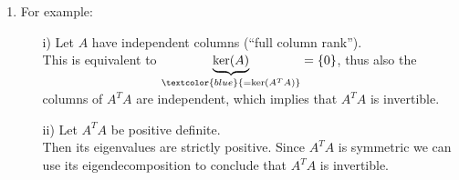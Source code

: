 {\begin{enumerate}
		\underline{``$\text{ker}(A^TA)\subseteq \text{ker}(A)$'':}\\
		Let $x\in \text{ker}(A^TA) \stackrel{\textcolor{blue}{\text{Def.}}}{\Rightarrow}A^TAx=0\Rightarrow \underbrace{x^TA^TAx}_{\textcolor{blue}{=\|{Ax}\|_2^2}}=0 \stackrel{\textcolor{blue}{\text{norm} \|{\cdot}\|_2^2\ \text{is definite}}}{\Rightarrow}Ax=0 \stackrel{\textcolor{blue}{\text{Def.}}}{\Rightarrow}x\in \text{ker}(A)$.\\~\\
 \textbf{(b)} $\ker(A^T) = \ker(AA^T)$:\\[0.2cm]
		Define $C:=A^T$ and apply result (a) to $C$; note that $C^TC = AA^T$.
	\item For example:
	\begin{enumerate}
		\item[i)] 
		Let $A$ have independent columns (``full column rank'').\\
		This is equivalent to $\underbrace{\text{ker}(A)}_{\textcolor{blue}{=\text{ker}(A^TA)}}=\{0\}$, thus also the columns of $A^TA$ are independent, which implies that $A^TA$ is invertible.
		\item[ii)] Let 	$A^TA$ be positive definite.\\
		Then its eigenvalues are strictly positive. Since $A^TA$ is symmetric we can use its eigendecomposition to conclude that $A^TA$ is invertible.
	\end{enumerate}
\end{enumerate}
}